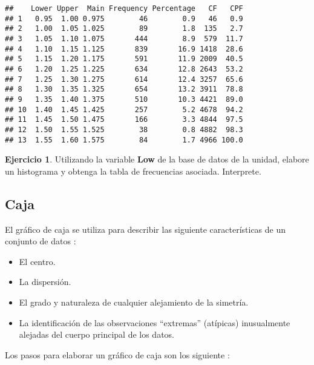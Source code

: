 \documentclass[
]{book}
\providecommand{\tightlist}{%
  \setlength{\itemsep}{0pt}\setlength{\parskip}{0pt}}
\theoremstyle{definition}
\theoremstyle{definition}
\theoremstyle{definition}
\newtheorem{exercise}{Ejercicio}[chapter]
\theoremstyle{definition}
\theoremstyle{remark}
\begin{document}
\begin{verbatim}
##    Lower Upper  Main Frequency Percentage   CF   CPF
## 1   0.95  1.00 0.975        46        0.9   46   0.9
## 2   1.00  1.05 1.025        89        1.8  135   2.7
## 3   1.05  1.10 1.075       444        8.9  579  11.7
## 4   1.10  1.15 1.125       839       16.9 1418  28.6
## 5   1.15  1.20 1.175       591       11.9 2009  40.5
## 6   1.20  1.25 1.225       634       12.8 2643  53.2
## 7   1.25  1.30 1.275       614       12.4 3257  65.6
## 8   1.30  1.35 1.325       654       13.2 3911  78.8
## 9   1.35  1.40 1.375       510       10.3 4421  89.0
## 10  1.40  1.45 1.425       257        5.2 4678  94.2
## 11  1.45  1.50 1.475       166        3.3 4844  97.5
## 12  1.50  1.55 1.525        38        0.8 4882  98.3
## 13  1.55  1.60 1.575        84        1.7 4966 100.0
\end{verbatim}

\begin{exercise}
Utilizando la variable \textbf{Low} de la base de datos de la unidad, elabore un histograma y obtenga la tabla de frecuencias asociada. Interprete.
\end{exercise}

\hypertarget{caja}{%
\subsection{Caja}\label{caja}}

El gráfico de caja se utiliza para describir las siguiente características de un conjunto de datos \citep[página 35]{Devore}:

\begin{itemize}
\tightlist
\item
  El centro.
\item
  La dispersión.
\item
  El grado y naturaleza de cualquier alejamiento de la simetría.
\item
  La identificación de las observaciones ``extremas'' (atípicas) inusualmente alejadas del cuerpo principal de los datos.
\end{itemize}

Los pasos para elaborar un gráfico de caja son los siguiente \citep[página 106]{anderson}:
\end{document}
